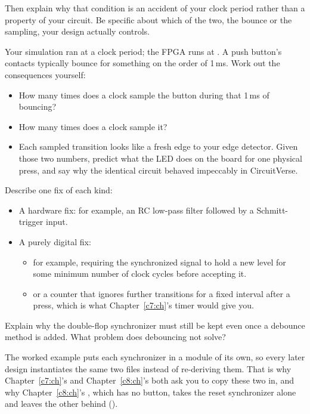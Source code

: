 \begin{parts}
    Then explain why that condition is an accident of your clock period rather than a property of
    your circuit. Be specific about which of the two, the bounce or the sampling, your design
    actually controls.
  \item Your simulation ran at a  clock period; the FPGA runs at . A push
    button's contacts typically bounce for something on the order of 1\,ms. Work out the
    consequences yourself:
    \begin{itemize}
      \item How many times does a  clock sample the button during that 1\,ms of
        bouncing?
      \item How many times does a  clock sample it?
      \item Each sampled transition looks like a fresh edge to your edge detector. Given those two
        numbers, predict what the LED does on the board for one physical press, and say why the
        identical circuit behaved impeccably in CircuitVerse.
    \end{itemize}
  \item Describe one fix of each kind:
    \begin{itemize}
      \item A hardware fix: for example, an RC low-pass filter followed by a Schmitt-trigger input.
      \item A purely digital fix:
        \begin{itemize}
          \item for example, requiring the synchronized signal to hold a new level for some minimum
            number of clock cycles before accepting it.
          \item or a counter that ignores further transitions for a fixed interval after a press,
            which is what Chapter~\ref{c7:ch}'s timer would give you.
        \end{itemize}
    \end{itemize}
  \item Explain why the double-flop synchronizer must still be kept even once a debounce method is
    added. What problem does debouncing not solve?
\end{parts}

\label{c4:set:5}
The worked example puts each synchronizer in a module of its own, so every later design
instantiates the same two files instead of re-deriving them. That is why Chapter~\ref{c7:ch}'s
 and Chapter~\ref{c8:ch}'s  both ask you to copy these two in, and
why Chapter~\ref{c8:ch}'s , which has no button, takes the reset synchronizer
alone and leaves the other behind ().

